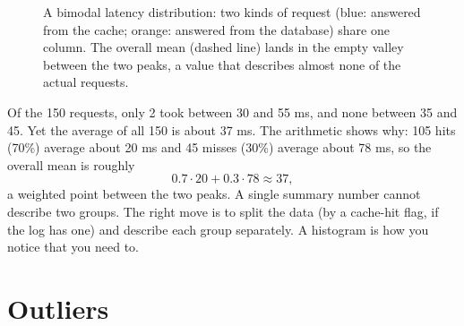 \begin{figure}[H]
\centering
{}
\caption{A bimodal latency distribution: two kinds of request (blue: answered from the cache;
orange: answered from the database) share one column. The overall mean (dashed line) lands in
the empty valley between the two peaks, a value that describes almost none of the actual
requests.}
\label{fig:data-bimodal}
\end{figure}

Of the 150 requests, only 2 took between 30 and 55 ms, and none between 35 and 45. Yet the
average of all 150 is about 37 ms. The arithmetic shows why: 105 hits (70\%) average about
20 ms and 45 misses (30\%) average about 78 ms, so the overall mean is roughly
\[
  0.7 \cdot 20 + 0.3 \cdot 78 \approx 37,
\]
a weighted point between the two peaks. A single
summary number cannot describe two groups. The right move is to split the
data (by a cache-hit flag, if the log has one) and describe each group separately. A
histogram is how you notice that you need to.

\section{Outliers}
\label{sec:data-outliers}

